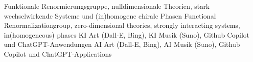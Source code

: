 \documentclass[color=TUDa-1b]{komacv}
\begin{document}

\cvitem%
	{}%
	{}
\cvitem%
	{}%
	{}
\cvitem%
	{}
	{\lang%
		{Funktionale Renormierungsgruppe, nulldimensionale Theorien, stark wechselwirkende Systeme und (in)homogene chirale Phasen}%
		{Functional Renormalizationgroup, zero-dimensional theories, strongly interacting systems, in(homogeneous) phases}
	}
\cvitem%
	{}
	{\lang%
		{KI Art (Dall-E, Bing), KI Musik (Suno), Github Copilot und ChatGPT-Anwendungen}%
		{AI Art (Dall-E, Bing), AI Musik (Suno), Github Copilot und ChatGPT-Applications}
	}
\end{document}
